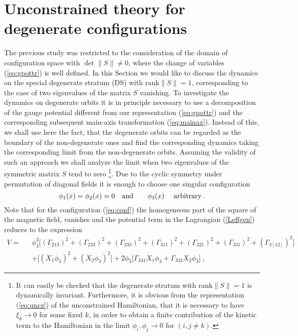 \documentclass[a4paper,12pt]{article}
\begin{document}
\section{Unconstrained theory for degenerate configurations  }



The previous study  was restricted to the
consideration of the domain of configuration space with $\det \|S\| \neq 0$,
where the change of variables (\ref{eq:gpottr}) is well defined.
In this Section we would like to discuss the dynamics on
the special degenerate stratum (DS) with $\mbox{rank}\|S\| = 1$,
corresponding to the case of two eigenvalues of the matrix $S$ vanishing.
To investigate the dynamics on degenerate orbits it is in principle
necessary to use a decomposition of the gauge potential
different from our representation (\ref{eq:gpottr})
and the corresponding subsequent main-axis transformation (\ref{eq:mainax}).
Instead of this, we shall use here the fact, that the
degenerate orbits can be regarded as the boundary of the non-degenerate ones
and find the corresponding dynamics taking the corresponding limit from
the non-degenerate orbits.
Assuming the validity of such an approach
we shall analyze the limit when
two eigenvalues of the symmetric matrix $S$  tend to zero
\footnote{
It can easily be checked that the degenerate stratum with
$\mbox{rank}\|S\|=1$ is dynamically invariant.
Furthermore, it is obvious from the representation
(\ref{eq:uncz}) of the unconstrained Hamiltonian, that it is necessary to have
$\xi_k\rightarrow 0$ for some fixed $k$,
in order to obtain a finite contribution of the
kinetic term to the Hamiltonian in the limit
$\phi_i,\phi_j\rightarrow 0$ for $(i, j \neq k)$.}.
Due to the cyclic symmetry under permutation of diagonal fields
it is enough to choose one  singular configuration
\begin{equation}
\label{eq:conf}
\phi_1(x) = \phi_2(x) = 0\ \ \ {\rm and} \qquad \phi_3(x)
\ \quad {\rm arbitrary}\,.
\end{equation}
Note that for the configuration (\ref{eq:conf}) the homogeneous part of the
square of the magnetic field, vanishes and the potential term in the
Lagrangian (\ref{Leffgen}) reduces to the expression
\begin{eqnarray}
V =
&& \phi_3^2\big[(\Gamma_{2 1 3})^2+(\Gamma_{2 2 3})^2
           +(\Gamma_{2 3 3})^2
           +(\Gamma_{3 1 1})^2+(\Gamma_{3 2 1})^2
           +(\Gamma_{3 3 1})^2 + (\Gamma_{3 [12]})^2 \big]\nonumber\\
&& +\big[(X_1\phi_3)^2+(X_2\phi_3)^2\big]
   +2\phi_3\big[\Gamma_{3 3 1} X_1\phi_3
                   +\Gamma_{3 3 2} X_2\phi_3\big]~,
\label{V21}
\end{eqnarray}
\end{document}
